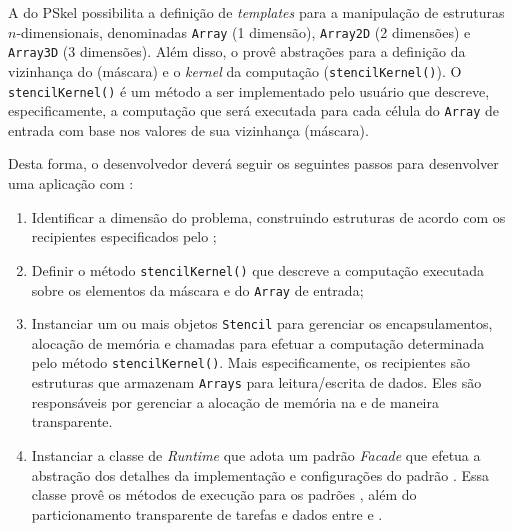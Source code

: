 A \api do PSkel possibilita a definição de \textit{templates} para a manipulação
de estruturas $n$-dimensionais, denominadas \texttt{Array} (1 dimensão),
\texttt{Array2D} (2 dimensões) e \texttt{Array3D} (3 dimensões). Além disso, o
\fw provê abstrações para a definição da vizinhança do \stencil (máscara)
e o \textit{kernel} da computação \stencil (\texttt{stencilKernel()}). O
\texttt{stencilKernel()} é um método a ser implementado pelo usuário que
descreve, especificamente, a computação que será executada para cada célula do
\texttt{Array} de entrada com base nos valores de sua vizinhança (máscara).

Desta forma, o desenvolvedor deverá seguir os seguintes passos para desenvolver
uma aplicação \stencil com \pskel:

\begin{enumerate}
	\item Identificar a dimensão do problema, construindo estruturas de acordo com
	os recipientes especificados pelo \fw;

	\item Definir o método \texttt{stencilKernel()} que descreve a computação executada
	sobre os elementos da máscara e do \texttt{Array} de entrada;

	\item Instanciar um ou mais objetos \texttt{Stencil} para gerenciar os encapsulamentos,
	alocação de memória e chamadas para efetuar a computação determinada pelo método
	\texttt{stencilKernel()}. Mais especificamente, os recipientes são estruturas que
	armazenam \texttt{Arrays} para leitura/escrita de dados. Eles são responsáveis por
	gerenciar a alocação de memória na \cpu e \gpu de maneira transparente.

	\item Instanciar a classe de \textit{Runtime} que adota um padrão \textit{Facade} que
	efetua a abstração dos detalhes da implementação e configurações do padrão \stencil.
	Essa classe provê os métodos de execução para os padrões \stencil, além do
	particionamento transparente de tarefas e dados entre \cpu e \gpu.
\end{enumerate}

%

